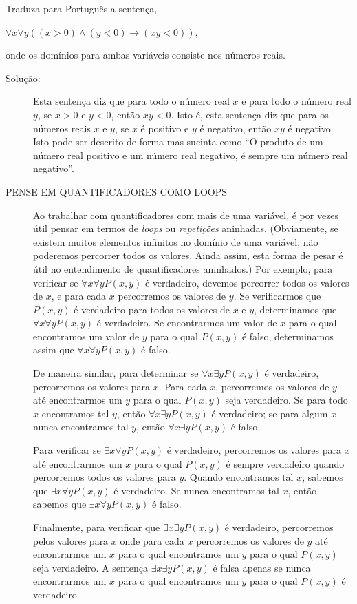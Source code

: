 \begin{exmp}
\label{exem149}
Traduza para Português a sentença,
\begin{center}
$\forall x\forall y((x>0) \land (y<0) \to (xy<0))$,
\end{center}
onde os domínios para ambas variáveis consiste nos números reais.
\begin{description}
\item[Solução:]Esta sentença diz que para todo o número real $x$ e para todo o
número real $y$, se $x>0$ e $y<0$, então $xy<0$. Isto é, esta sentença diz que
para os números reais $x$ e $y$, se $x$ é positivo e $y$ é negativo, então $xy$
é negativo. Isto pode ser descrito de forma mas sucinta como ``O produto de um
número real positivo e um número real negativo, é sempre um número real
negativo''.
\end{description}
\end{exmp}

\begin{description}
\item[PENSE EM QUANTIFICADORES COMO LOOPS] Ao trabalhar com quantificadores com
mais de uma variável, é por vezes útil pensar em termos de \emph{loops} ou 
\emph{repetições} aninhadas. (Obviamente, se existem muitos elementos infinitos
no domínio de uma variável, não poderemos percorrer todos os valores. Ainda
assim, esta forma de pesar é útil no entendimento de quantificadores aninhados.)
Por exemplo, para verificar se $\forall x\forall yP(x,y)$ é verdadeiro, devemos
percorrer todos os valores de $x$, e para cada $x$ percorremos os valores de
$y$. Se verificarmos que $P(x,y)$ é verdadeiro para todos os valores de $x$ e
$y$, determinamos que $\forall x\forall yP(x,y)$ é verdadeiro. Se encontrarmos
um valor de $x$ para o qual encontramos um valor de $y$ para o qual $P(x,y)$ é
falso, determinamos assim que $\forall x\forall yP(x,y)$ é falso. 

De maneira similar, para determinar se $\forall x\exists yP(x,y)$ é verdadeiro,
percorremos os valores para $x$. Para cada $x$, percorremos os valores de $y$
até encontrarmos um $y$ para o qual $P(x,y)$ seja verdadeiro. Se para todo $x$
encontramos tal $y$, então $\forall x\exists yP(x,y)$ é verdadeiro; se para
algum $x$ nunca encontramos tal $y$, então $\forall x\exists yP(x,y)$ é falso.

Para verificar se $\exists x\forall yP(x,y)$ é verdadeiro, percorremos os
valores para $x$ até encontrarmos um $x$ para o qual $P(x,y)$ é sempre
verdadeiro quando percorremos todos os valores para $y$. Quando encontramos tal
$x$, sabemos que $\exists x\forall yP(x,y)$ é verdadeiro. Se nunca encontramos
tal $x$, então sabemos que $\exists x\forall yP(x,y)$ é falso.

Finalmente, para verificar que $\exists x\exists yP(x,y)$ é verdadeiro,
percorremos pelos valores para $x$ onde para cada $x$ percorremos os valores de
$y$ até encontrarmos um $x$ para o qual encontramos um $y$ para o qual $P(x,y)$
seja verdadeiro. A sentença $\exists x\exists yP(x,y)$ é falsa apenas se nunca
encontrarmos um $x$ para o qual encontramos um $y$ para o qual $P(x,y)$ é
verdadeiro.
\end{description}


